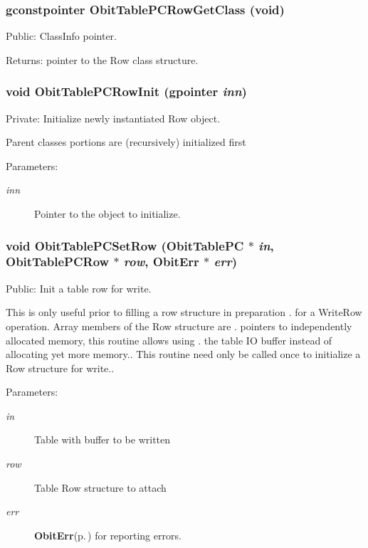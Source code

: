 \subsubsection{\setlength{\rightskip}{0pt plus 5cm}gconstpointer Obit\-Table\-PCRow\-Get\-Class (void)}\label{ObitTablePC_8c_a15}


Public: Class\-Info pointer. 

\begin{Desc}
\item[Returns:]pointer to the Row class structure. \end{Desc}
\subsubsection{\setlength{\rightskip}{0pt plus 5cm}void Obit\-Table\-PCRow\-Init (gpointer {\em inn})}\label{ObitTablePC_8c_a6}


Private: Initialize newly instantiated Row object. 

Parent classes portions are (recursively) initialized first \begin{Desc}
\item[Parameters:]
\begin{description}
\item[{\em inn}]Pointer to the object to initialize. \end{description}
\end{Desc}
\subsubsection{\setlength{\rightskip}{0pt plus 5cm}void Obit\-Table\-PCSet\-Row ({\bf Obit\-Table\-PC} $\ast$ {\em in}, {\bf Obit\-Table\-PCRow} $\ast$ {\em row}, {\bf Obit\-Err} $\ast$ {\em err})}\label{ObitTablePC_8c_a23}


Public: Init a table row for write. 

This is only useful prior to filling a row structure in preparation . for a Write\-Row operation. Array members of the Row structure are . pointers to independently allocated memory, this routine allows using . the table IO buffer instead of allocating yet more memory.. This routine need only be called once to initialize a Row structure for write.. \begin{Desc}
\item[Parameters:]
\begin{description}
\item[{\em in}]Table with buffer to be written \item[{\em row}]Table Row structure to attach \item[{\em err}]{\bf Obit\-Err}{\rm (p.\,\pageref{structObitErr})} for reporting errors. \end{description}
\end{Desc}
